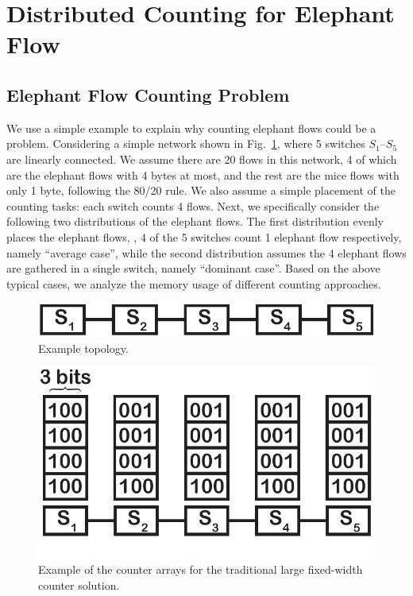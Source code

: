 \section{Distributed Counting for Elephant Flow}\label{sec:to}
\subsection{Elephant Flow Counting Problem}\label{sec:to-prob}
We use a simple example to explain why counting elephant flows could be a problem.
Considering a simple network shown in Fig.~\ref{fig:exam-topo5}, where 5 switches $S_1$--$S_5$ are linearly connected.
We assume there are 20 flows in this network, 4 of which are the elephant flows with 4 bytes at most, and the rest are the mice flows with only 1 byte, following the 80/20 rule.
We also assume a simple placement of the counting tasks: each switch counts 4 flows.
Next, we specifically consider the following two distributions of the elephant flows.
The first distribution evenly places the elephant flows, \eg, 4 of the 5 switches count 1 elephant flow respectively, namely ``average case'', while the second distribution assumes the 4 elephant flows are gathered in a single switch, namely ``dominant case''.
Based on the above typical cases, we analyze the memory usage of different counting approaches.

\begin{figure}[t]
    \centering
    \includegraphics[width=0.6\linewidth]{pic/exam-topo5.pdf}
    \caption{Example topology.
    }
    \label{fig:exam-topo5}
    \vspace{-0.1in}
\end{figure}

\begin{figure}[t]
    \centering
    \includegraphics[width=0.6\linewidth]{pic/exam-fixed-width.pdf}
    \caption{Example of the counter arrays for the traditional large fixed-width counter solution.
    }
    \label{fig:exam-fixed-width}
    \vspace{-0.1in}
\end{figure}

